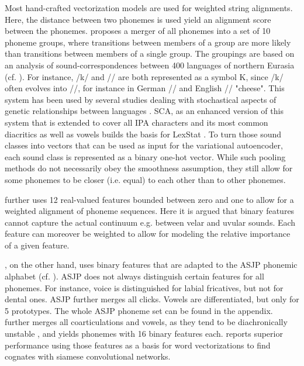 \documentclass[6pt]{article}
\begin{document}
Most hand-crafted vectorization models are used for weighted string alignments. Here, the distance between two phonemes is used yield an alignment score between the phonemes. \cite{dolgopolsky1986probabilistic} proposes a merger of all phonemes into a set of 10 phoneme groups, where transitions between  members of a group are more likely than transitions between members of a single group. The groupings are based on an analysis of sound-correspondences between 400 languages of northern Eurasia (cf. \cite[p. 119]{list2012lexstat}). For instance, /k/ and // are both represented as a symbol K, since /k/ often evolves into //, for instance in German // and English // "cheese". This system has been used by several studies dealing with stochastical aspects of genetic relationships between languages \citep{baxter2000beyond,mortarino2009improved,turchin2010analyzing}. SCA, as an enhanced version of this system that is extended to cover all IPA characters and its most common diacritics as well as vowels builds the basis for LexStat \citep{list2012sca,list2012lexstat}. To turn those sound classes into vectors that can be used as input for the variational autoencoder, each sound class is represented as a binary one-hot vector. While such pooling methods do not necessarily obey the smoothness assumption, they still allow for some phonemes to be closer (i.e. equal) to each other than to other phonemes. 

 \cite{kondrak2000new} further uses 12 real-valued features bounded between zero and one to allow for a weighted alignment of phoneme sequences. Here it is argued that binary features cannot capture the actual continuum e.g. between velar and uvular sounds. Each feature can moreover be weighted to allow for modeling the relative importance of a given feature.


\cite{rama2016siamese}, on the other hand,  uses binary features that are adapted to the ASJP phonemic alphabet (cf. \cite{wichmann2010asjp}). ASJP does not always distinguish certain features for all phonemes. For instance, voice is distinguished for labial fricatives, but not for dental ones. ASJP further merges all clicks. Vowels are differentiated, but only for 5 prototypes. The whole ASJP phoneme set can be found in the appendix. \cite{rama2016siamese} further merges all coarticulations and vowels, as they tend to be diachronically unstable \citep{kessler2007word}, and yields phonemes with 16 binary features each. \cite{rama2016siamese} reports superior performance using those features as a basis for word vectorizations to find cognates with siamese convolutional networks.
\end{document}
